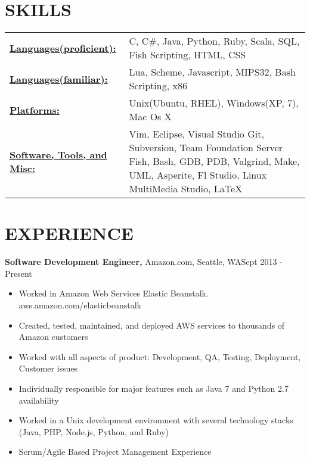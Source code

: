 \documentclass{res}
\begin{document}
 
\address{2226 Elliott Ave Apt 113, Seattle, WA 98121 (928) 284-5522 Charliec364@gmail.com }


\begin{resume}

\section{SKILLS}
   \begin{tabular}{l p{3in}}
     \underline{\bf Languages(proficient):} & C, C\#, Java, Python, Ruby, Scala, SQL, Fish Scripting, HTML, CSS \\
     \underline{\bf Languages(familiar):} & Lua, Scheme, Javascript, MIPS32, Bash Scripting, x86 \\
     \underline{\bf Platforms:} & Unix(Ubuntu, RHEL), Windows(XP, 7), Mac Os X \\
     \underline{\bf Software, Tools, and Misc:} &  Vim, Eclipse, Visual Studio
                        Git, Subversion, Team Foundation Server
                        Fish, Bash, GDB, PDB, Valgrind, Make, 
                        UML, Asperite, Fl Studio, Linux MultiMedia Studio, \LaTeX\
 \end{tabular}
 
\section{EXPERIENCE}
  {\bf Software Development Engineer,} Amazon.com, Seattle, WA\hfill Sept 2013 - Present
  \begin{itemize} \itemsep -2pt  %
    \item Worked in Amazon Web Services Elastic Beanstalk. aws.amazon.com/elasticbeanstalk
    \item Created, tested, maintained, and deployed AWS services to thousands of Amazon customers
    \item Worked with all aspects of product: Development, QA, Testing, Deployment, Customer issues
    \item Individually responsible for major features such as Java 7 and Python 2.7 availability
    \item Worked in a Unix development environment with several technology stacks (Java,  PHP, Node.js, Python, and Ruby)
    \item Scrum/Agile Based Project Management Experience
  \end{itemize}


\end{resume}
\end{document}

